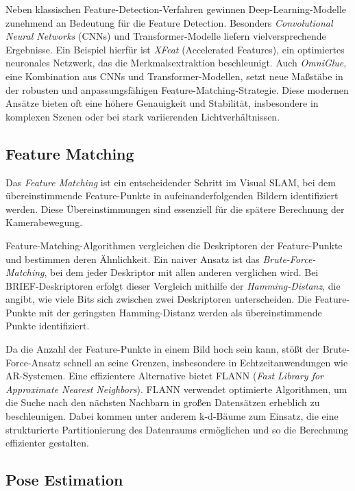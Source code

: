 Neben klassischen Feature-Detection-Verfahren gewinnen Deep-Learning-Modelle zunehmend an Bedeutung für die Feature Detection. Besonders \emph{Convolutional Neural Networks} (CNNs) und Transformer-Modelle liefern vielversprechende Ergebnisse. Ein Beispiel hierfür ist \emph{XFeat} (Accelerated Features), ein optimiertes neuronales Netzwerk, das die Merkmalsextraktion beschleunigt. Auch \emph{OmniGlue}, eine Kombination aus CNNs und Transformer-Modellen, setzt neue Maßstäbe in der robusten und anpassungsfähigen Feature-Matching-Strategie. Diese modernen Ansätze bieten oft eine höhere Genauigkeit und Stabilität, insbesondere in komplexen Szenen oder bei stark variierenden Lichtverhältnissen. \cite{ghosh2024fmNN}

\subsection{Feature Matching}

Das \emph{Feature Matching} ist ein entscheidender Schritt im Visual SLAM, bei dem übereinstimmende Feature-Punkte in aufeinanderfolgenden Bildern identifiziert werden. Diese Übereinstimmungen sind essenziell für die spätere Berechnung der Kamerabewegung. \cite{gao2021vSLAM, szeliski2022computerVision}

Feature-Matching-Algorithmen vergleichen die Deskriptoren der Feature-Punkte und bestimmen deren Ähnlichkeit. Ein naiver Ansatz ist das \emph{Brute-Force-Matching}, bei dem jeder Deskriptor mit allen anderen verglichen wird. Bei BRIEF-Deskriptoren erfolgt dieser Vergleich mithilfe der \emph{Hamming-Distanz}, die angibt, wie viele Bits sich zwischen zwei Deskriptoren unterscheiden. Die Feature-Punkte mit der geringsten Hamming-Distanz werden als übereinstimmende Punkte identifiziert. \cite{gao2021vSLAM, szeliski2022computerVision}

Da die Anzahl der Feature-Punkte in einem Bild hoch sein kann, stößt der Brute-Force-Ansatz schnell an seine Grenzen, insbesondere in Echtzeitanwendungen wie AR-Systemen. Eine effizientere Alternative bietet FLANN (\emph{Fast Library for Approximate Nearest Neighbors}). FLANN verwendet optimierte Algorithmen, um die Suche nach den nächsten Nachbarn in großen Datensätzen erheblich zu beschleunigen. Dabei kommen unter anderem k-d-Bäume zum Einsatz, die eine strukturierte Partitionierung des Datenraums ermöglichen und so die Berechnung effizienter gestalten. \cite{gao2021vSLAM, muja2009flann}

\subsection{Pose Estimation}

